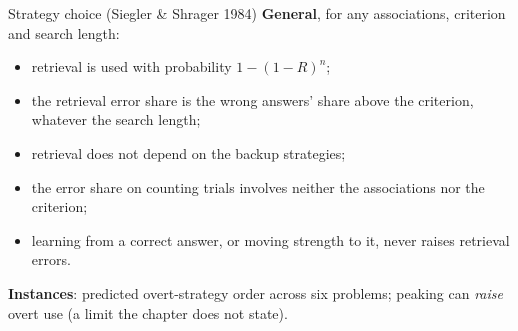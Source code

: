 \documentclass[aspectratio=169,11pt]{beamer}
\begin{document}
\begin{frame}{Strategy choice (Siegler \& Shrager 1984)}
  \small
  \textbf{General}, for any associations, criterion and search length:
  \begin{itemize}
    \item retrieval is used with probability $1-(1-R)^n$;
    \item the retrieval error share is the wrong answers' share above the criterion, whatever the search length;
    \item retrieval does not depend on the backup strategies;
    \item the error share on counting trials involves neither the associations nor the criterion;
    \item learning from a correct answer, or moving strength to it, never raises retrieval errors.
  \end{itemize}
  \textbf{Instances}: predicted overt-strategy order across six problems; peaking can \emph{raise} overt use (a limit the chapter does not state).
\end{frame}
\end{document}
